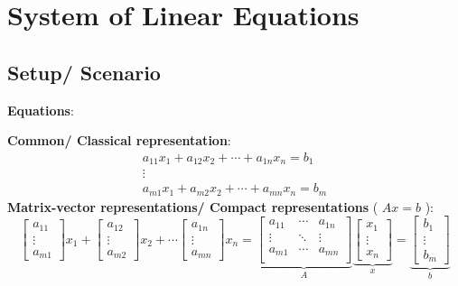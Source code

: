 

\section{System of Linear Equations \cite{mfml-1}}\label{System of Linear Equations}

\subsection*{Setup/ Scenario}

\textbf{Equations}:

\noindent\textbf{Common/ Classical representation}:
\[
    \begin{matrix}
        a_{11}x_1 + a_{12}x_2 + \cdots + a_{1n}x_n = b_1\\
        \vdots \\
        a_{m1}x_1 + a_{m2}x_2 + \cdots + a_{mn}x_n = b_m
    \end{matrix}
\]       
\textbf{Matrix-vector representations/ Compact representations} ( $Ax=b$ ):
\[
    \begin{bmatrix}
        a_{11}\\ \vdots\\ a_{m1}
    \end{bmatrix} x_1 +
    \begin{bmatrix}
        a_{12}\\ \vdots\\ a_{m2}
    \end{bmatrix} x_2 +
    \cdots
    \begin{bmatrix}
        a_{1n}\\ \vdots\\ a_{mn}
    \end{bmatrix} x_n
    =
    \underset{A}{
        \underbrace{
            \begin{bmatrix}
                a_{11} & \cdots & a_{1n}\\
                \vdots & \ddots & \vdots \\
                a_{m1} & \cdots & a_{mn}\\
            \end{bmatrix}
        }
    }
    \underset{x}{
        \underbrace{
            \begin{bmatrix}
                x_1 \\ \vdots \\ x_n
            \end{bmatrix}
        }
    }
    =
    \underset{b}{
        \underbrace{
            \begin{bmatrix}
                b_{1}\\ \vdots\\ b_{m}
            \end{bmatrix}
        }
    }
\]


